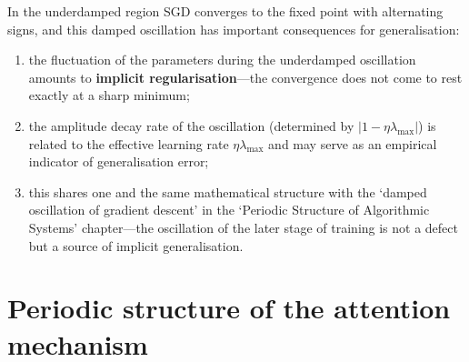 \begin{remark}\label{rem:sgd_limit_cycle_generalisation}
In the underdamped region SGD converges to the fixed point with alternating signs, and this damped oscillation has important consequences for generalisation:
\begin{enumerate}[label=(\roman*)]
    \item the fluctuation of the parameters during the underdamped oscillation amounts to \textbf{implicit regularisation}---the convergence does not come to rest exactly at a sharp minimum;
    \item the amplitude decay rate of the oscillation (determined by $|1-\eta\lambda_{\max}|$) is related to the effective learning rate $\eta\lambda_{\max}$ and may serve as an empirical indicator of generalisation error;
    \item this shares one and the same mathematical structure with the `damped oscillation of gradient descent' in the `Periodic Structure of Algorithmic Systems' chapter---the oscillation of the later stage of training is not a defect but a source of implicit generalisation.
\end{enumerate}
\end{remark}

\section{Periodic structure of the attention mechanism}

